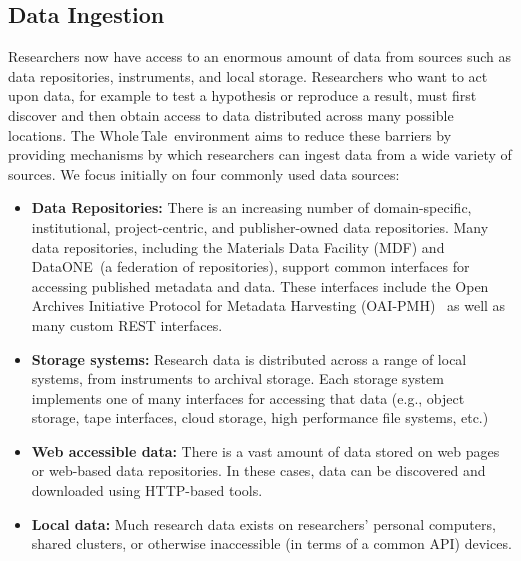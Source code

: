 \documentclass{elsarticle}
\newcommand{\wt}{Whole\,Tale}
\begin{document}
\subsection{Data Ingestion}
\label{sec:data_ingestion}
Researchers now have access to an enormous amount of data from 
sources such as data repositories, instruments, and local storage. 
Researchers who want to act upon data, for example to test a hypothesis
or reproduce a result, must first discover and then obtain access to
data distributed across many possible locations. The \wt\ environment aims to 
reduce these barriers by providing mechanisms by which researchers
can ingest data from a wide variety of sources. We focus initially
on four commonly used data sources: 

\begin{itemize}
	\item \textbf{Data Repositories:} 
    There is an increasing number of domain-specific, institutional, project-centric, and publisher-owned data repositories. 
    Many data repositories, including the Materials Data Facility (MDF) and DataONE~\cite{michener15dataone}(a federation of repositories), support common interfaces for accessing published metadata and data.
    These interfaces include the 
    Open Archives Initiative Protocol for Metadata Harvesting (OAI-PMH)~\cite{oaipmh}
    as well as many custom REST interfaces.

    \item \textbf{Storage systems:} Research data is distributed across a range
    of local systems, from instruments to archival storage. Each storage system
    implements one of many interfaces for accessing that data (e.g., object storage,
    tape interfaces, cloud storage, high performance file systems, etc.)  
    
    \item \textbf{Web accessible data:} There is a vast amount of data stored
    on web pages or web-based data repositories. In these cases, data can be discovered and downloaded using HTTP-based tools.

    \item \textbf{Local data:} Much research data exists on researchers' personal
    computers, shared clusters, or otherwise inaccessible (in terms of a common API) devices. 
\end{itemize}
\end{document}
